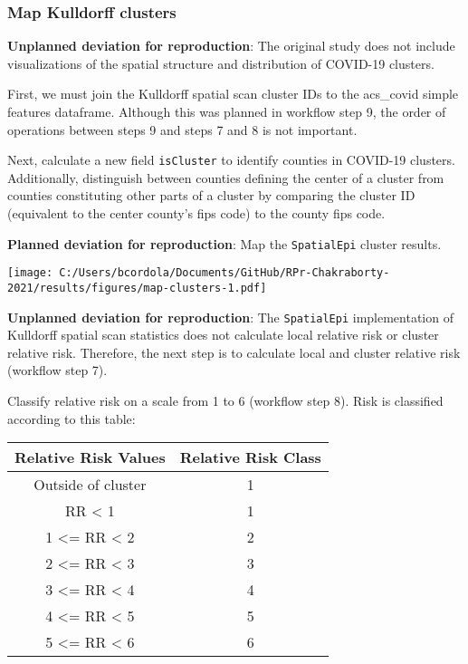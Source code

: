 \documentclass[
]{article}
\begin{document}
\hypertarget{map-kulldorff-clusters}{%
\subsubsection{Map Kulldorff clusters}\label{map-kulldorff-clusters}}

\textbf{Unplanned deviation for reproduction}: The original study does
not include visualizations of the spatial structure and distribution of
COVID-19 clusters.

First, we must join the Kulldorff spatial scan cluster IDs to the
acs\_covid simple features dataframe. Although this was planned in
workflow step 9, the order of operations between steps 9 and steps 7 and
8 is not important.

Next, calculate a new field \texttt{isCluster} to identify counties in
COVID-19 clusters. Additionally, distinguish between counties defining
the center of a cluster from counties constituting other parts of a
cluster by comparing the cluster ID (equivalent to the center county's
fips code) to the county fips code.

\textbf{Planned deviation for reproduction}: Map the \texttt{SpatialEpi}
cluster results.

\texttt{[image: C:/Users/bcordola/Documents/GitHub/RPr-Chakraborty-2021/results/figures/map-clusters-1.pdf]}

\textbf{Unplanned deviation for reproduction}: The \texttt{SpatialEpi}
implementation of Kulldorff spatial scan statistics does not calculate
local relative risk or cluster relative risk. Therefore, the next step
is to calculate local and cluster relative risk (workflow step 7).

Classify relative risk on a scale from 1 to 6 (workflow step 8). Risk is
classified according to this table:

\begin{longtable}[]{@{}cc@{}}
\toprule\noalign{}
Relative Risk Values & Relative Risk Class \\
\midrule\noalign{}
\endhead
\bottomrule\noalign{}
\endlastfoot
Outside of cluster & 1 \\
RR \textless{} 1 & 1 \\
1 \textless= RR \textless{} 2 & 2 \\
2 \textless= RR \textless{} 3 & 3 \\
3 \textless= RR \textless{} 4 & 4 \\
4 \textless= RR \textless{} 5 & 5 \\
5 \textless= RR \textless{} 6 & 6 \\
\end{longtable}
\end{document}
